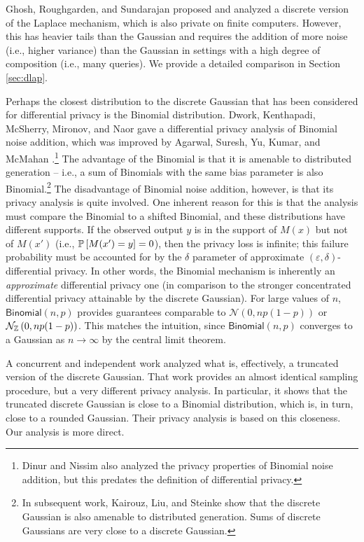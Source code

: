 \documentclass{jpc}
\newcommand{\dgausss}[2]{{\discN\left(#1,#2\right)}}
\newcommand{\dgauss}[1]{\dgausss{0}{#1}}
\newcommand{\pr}[2]{{\ifx&#1& \mathbb{P} \else
\underset{#1}{\mathbb{P}} \fi \left[#2\right]}}
\newcommand{\eps}{\varepsilon}
\begin{document}
Ghosh, Roughgarden, and Sundarajan \cite{GhoshRS12} proposed and analyzed a discrete version of the Laplace mechanism, which is also private on finite computers. However, this has heavier tails than the Gaussian and requires the addition of more noise (i.e., higher variance) than the Gaussian in settings with a high degree of composition (i.e., many queries). We provide a detailed comparison in Section \ref{sec:dlap}. 

Perhaps the closest distribution to the discrete Gaussian that has been considered for differential privacy is the Binomial distribution. Dwork, Kenthapadi, McSherry, Mironov, and Naor \cite{DworkKMMN06} gave a differential privacy analysis of Binomial noise addition, which was improved by Agarwal, Suresh, Yu, Kumar, and McMahan \cite{AgarwalSYKM18}.\footnote{Dinur and Nissim \cite{DinurN03} also analyzed the privacy properties of Binomial noise addition, but this predates the definition of differential privacy.} The advantage of the Binomial is that it is amenable to distributed generation -- i.e., a sum of Binomials with the same bias parameter is also Binomial.\footnote{In subsequent work, Kairouz, Liu, and Steinke \cite{KairouzLS21} show that the discrete Gaussian is also amenable to distributed generation. Sums of discrete Gaussians are very close to a discrete Gaussian.} The disadvantage of Binomial noise addition, however, is that its privacy analysis is quite involved. One inherent reason for this is that the analysis must compare the Binomial to a shifted Binomial, and these distributions have different supports. If the observed output $y$ is in the support of $M(x)$ but not of $M(x')$ (i.e., $\pr{}{M(x')=y}=0$), then the privacy loss is infinite; this failure probability must be accounted for by the $\delta$ parameter of approximate $(\eps,\delta)$-differential privacy. In other words, the Binomial mechanism is inherently an \emph{approximate} differential privacy one (in comparison to the stronger concentrated differential privacy attainable by the discrete Gaussian). For large values of $n$, $\mathsf{Binomial}(n,p)$ provides guarantees comparable to $\mathcal{N}(0,np(1-p))$ or $\dgauss{np(1-p)}$. This matches the intuition, since $\mathsf{Binomial}(n,p)$ converges to a Gaussian as $n \to \infty$ by the central limit theorem. 

A concurrent and independent work \citep{GoogleDGauss} analyzed what is, effectively, a truncated version of the discrete Gaussian. That work provides an almost identical sampling procedure, but a very different privacy analysis. In particular, it shows that the truncated discrete Gaussian is close to a Binomial distribution, which is, in turn, close to a rounded Gaussian. Their privacy analysis is based on this closeness. Our analysis is more direct.
\end{document}
